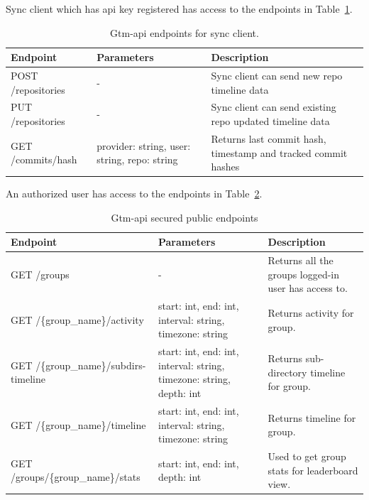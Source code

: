Sync client which has api key registered has access to the endpoints in Table~\ref{tab:gtm-api-endpoints-for-sync}.
\begin{table}[H]
    \centering
    \begin{tabular}{ | p{4cm} | p{4cm} | p{4cm} |}
        \hline
        Endpoint & Parameters & Description\\
        \hline
        POST /repositories & - & Sync client can send new repo timeline data \\
        \hline
        PUT /repositories & - & Sync client can send existing repo updated timeline data\\
        \hline
        GET /commits/hash & provider: string, user: string, repo: string & Returns last commit hash, timestamp and tracked commit hashes\\
        \hline
    \end{tabular}
    \caption{Gtm-api endpoints for sync client.}
    \label{tab:gtm-api-endpoints-for-sync}
\end{table}

An authorized user has access to the endpoints in Table~\ref{tab:gtm-api-endpoints-secured}.
\begin{table}[H]
    \centering
    \begin{tabular}{ | p{4cm} | p{4cm} | p{4cm} |}
        \hline
        Endpoint & Parameters & Description\\
        \hline
        GET /groups & - & Returns all the groups logged-in user has access to. \\
        \hline
        GET /\{group\_name\}/activity & start: int, end: int, interval: string, timezone: string & Returns activity for group. \\
        \hline
        GET /\{group\_name\}/subdirs-timeline & start: int, end: int, interval: string, timezone: string, depth: int & Returns sub-directory timeline for group. \\
        \hline
        GET /\{group\_name\}/timeline & start: int, end: int, interval: string, timezone: string & Returns timeline for group. \\
        \hline
        GET /groups/\{group\_name\}/stats & start: int, end: int, depth: int & Used to get group stats for leaderboard view.\\
        \hline
    \end{tabular}
    \caption{Gtm-api secured public endpoints}
    \label{tab:gtm-api-endpoints-secured}
\end{table}

